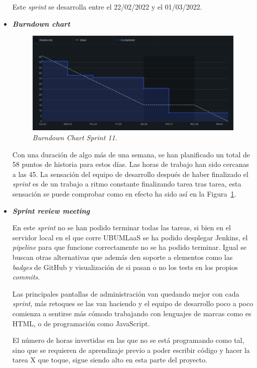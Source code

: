 \begin{itemize}
Este \textit{sprint} se desarrolla entre el 22/02/2022 y el 01/03/2022.
\item \textbf{\textit{Burndown chart}}
\begin{figure}
\begin{center}
\includegraphics[width=\textwidth]{../img/anexos/sprints/BD-Sprint11}
\caption{\textit{Burndown Chart Sprint 11.}}\label{fig:BD-Sprint11}
\end{center}
\end{figure}

Con una duración de algo más de una semana, se han planificado un total de 58 puntos de historia para estos días. Las horas de trabajo han sido cercanas a las 45. La sensación del equipo de desarrollo después de haber finalizado el \textit{sprint} es de un trabajo a ritmo constante finalizando tarea tras tarea, esta sensación se puede comprobar como en efecto ha sido así en la Figura~\ref{fig:BD-Sprint11}.

\item \textbf{\textit{Sprint review meeting}}

En este \textit{sprint} no se han podido terminar todas las tareas, si bien en el servidor local en el que corre UBUMLaaS se ha podido desplegar Jenkins, el \textit{pipeline} para que funcione correctamente no se ha podido terminar. Igual se buscan otras alternativas que además den soporte a elementos como las \textit{badges} de GitHub y visualización de si pasan o no los tests en los propios \textit{commits}.

Las principales pantallas de administración van quedando mejor con cada \textit{sprint}, más retoques se las van haciendo y el equipo de desarrollo poco a poco comienza a sentirse más cómodo trabajando con lenguajes de marcas como es HTML, o de programación como JavaScript.

El número de horas invertidas en las que no se está programando como tal, sino que se requieren de aprendizaje previo a poder escribir código y hacer la tarea X que toque, sigue siendo alto en esta parte del proyecto.

\end{itemize}

